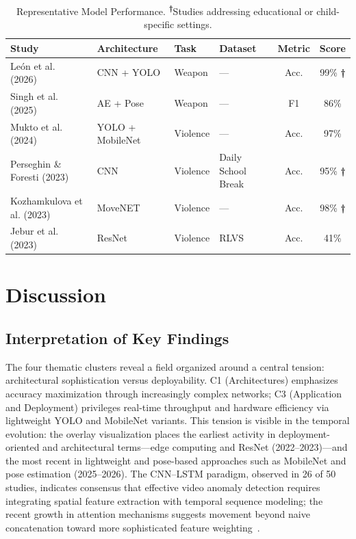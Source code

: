 \documentclass[conference]{IEEEtran}
\begin{document}
\begin{table}[t]
\caption{Representative Model Performance. \textsuperscript{\textbf{†}}Studies addressing educational or child-specific settings.}
\begin{center}
\scriptsize
\setlength{\tabcolsep}{2pt}
\renewcommand{\arraystretch}{1.1}
\begin{tabular}{|p{2.1cm}|p{2.0cm}|p{1.0cm}|p{1.8cm}|c|c|}
\hline
\textbf{Study} & \textbf{Architecture} & \textbf{Task} & \textbf{Dataset} & \textbf{Metric} & \textbf{Score} \\
\hline
Le\'{o}n et al. (2026)~\cite{b1} & CNN + YOLO & Weapon & — & Acc. & 99\% \textbf{†} \\
\hline
Singh et al. (2025)~\cite{b6} & AE + Pose & Weapon & — & F1 & 86\% \\
\hline
Mukto et al. (2024)~\cite{b3} & YOLO + MobileNet & Violence & — & Acc. & 97\% \\
\hline
Perseghin \& Foresti (2023)~\cite{b11} & CNN & Violence & Daily School Break & Acc. & 95\% \textbf{†} \\
\hline
Kozhamkulova et al. (2023)~\cite{b2} & MoveNET & Violence & — & Acc. & 98\% \textbf{†} \\
\hline
Jebur et al. (2023)~\cite{b18} & ResNet & Violence & RLVS & Acc. & 41\% \\
\hline
\end{tabular}
\label{tab:model-performance}
\end{center}
\end{table}

\section{Discussion}

\subsection{Interpretation of Key Findings}

The four thematic clusters reveal a field organized around a central tension: architectural sophistication versus deployability. C1 (Architectures) emphasizes accuracy maximization through increasingly complex networks; C3 (Application and Deployment) privileges real-time throughput and hardware efficiency via lightweight YOLO and MobileNet variants. This tension is visible in the temporal evolution: the overlay visualization places the earliest activity in deployment-oriented and architectural terms---edge computing and ResNet (2022--2023)---and the most recent in lightweight and pose-based approaches such as MobileNet and pose estimation (2025--2026). The CNN--LSTM paradigm, observed in 26 of 50 studies, indicates consensus that effective video anomaly detection requires integrating spatial feature extraction with temporal sequence modeling; the recent growth in attention mechanisms suggests movement beyond naive concatenation toward more sophisticated feature weighting~\cite{b5,b17}.
\end{document}
